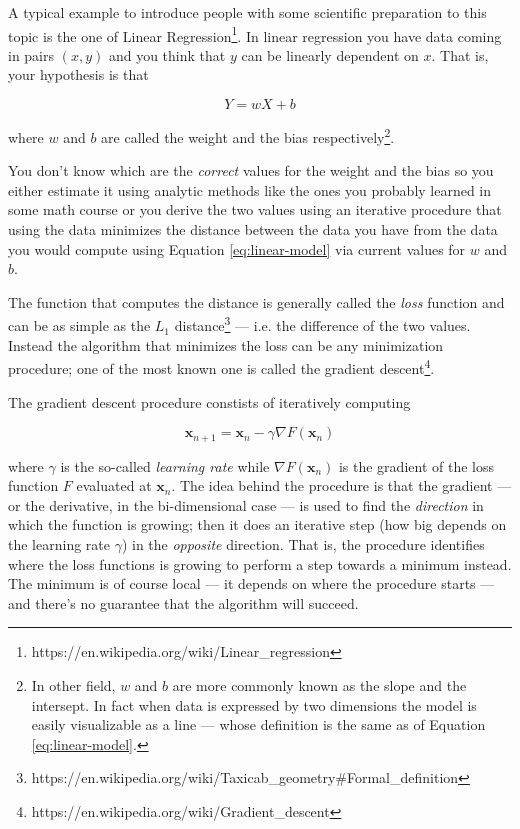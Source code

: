 A typical example to introduce people with some scientific preparation
to this topic is the one of Linear
Regression\footnote{https://en.wikipedia.org/wiki/Linear\_regression}.
In linear regression you have data coming in pairs $(x, y)$ and you
think that $y$ can be linearly dependent on $x$. That is, your
hypothesis is that

\begin{equation}
  Y = w X + b
  \label{eq:linear-model}
\end{equation}

where $w$ and $b$ are called the weight and the bias
respectively\footnote{In other field, $w$ and $b$ are more commonly
  known as the slope and the intersept. In fact when data is expressed
  by two dimensions the model is easily visualizable as a line ---
  whose definition is the same as of Equation \ref{eq:linear-model}.}.

You don't know which are the \emph{correct} values for the weight and
the bias so you either estimate it using analytic methods like the ones
you probably learned in some math course or you derive the two values
using an iterative procedure that using the data minimizes the distance
between the data you have from the data you would compute using
Equation \ref{eq:linear-model} via current values for $w$ and $b$.

The function that computes the distance is generally called the
\emph{loss} function and can be as simple as the $L_1$
distance\footnote{https://en.wikipedia.org/wiki/Taxicab\_geometry\#Formal\_definition}
--- i.e. the difference of the two values. Instead the algorithm that
minimizes the loss can be any minimization procedure; one of the most
known one is called the gradient
descent\footnote{https://en.wikipedia.org/wiki/Gradient\_descent}.

The gradient descent procedure constists of iteratively computing

\begin{equation}
  \boldsymbol{x}_{n+1} = \boldsymbol{x}_n - \gamma
  \nabla{F}(\boldsymbol{x}_n)
\end{equation}

where $\gamma$ is the so-called \emph{learning rate} while
$\nabla{F}(\boldsymbol{x}_n)$ is the gradient of the loss function $F$
evaluated at $\boldsymbol{x}_n$. The idea behind the procedure is that
the gradient --- or the derivative, in the bi-dimensional case --- is
used to find the \emph{direction} in which the function is growing;
then it does an iterative step (how big depends on the
learning rate $\gamma$) in the \emph{opposite} direction. That is, the
procedure identifies where the loss functions is growing to perform a
step towards a minimum instead. The minimum is of course local --- it depends on
where the procedure starts --- and there's no guarantee that the
algorithm will succeed.

